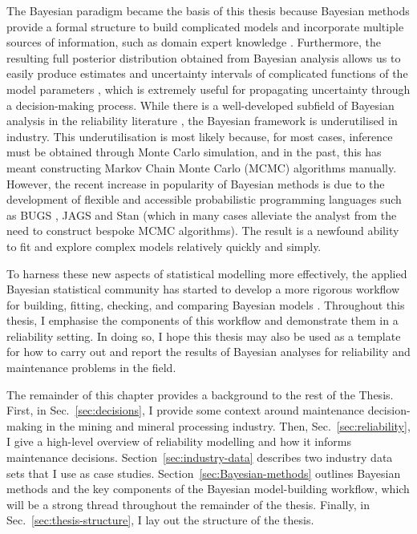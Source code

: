 The Bayesian paradigm became the basis of this thesis because Bayesian methods provide a formal structure to build complicated models and incorporate multiple sources of information, such as domain expert knowledge \citep{Meeker2022}. Furthermore, the resulting full posterior distribution obtained from Bayesian analysis allows us to easily produce estimates and uncertainty intervals of complicated functions of the model parameters \citep{Meeker2022}, which is extremely useful for propagating uncertainty through a decision-making process. While there is a well-developed subfield of Bayesian analysis in the reliability literature \citep{hamada_2008, Meeker2022}, the Bayesian framework is underutilised in industry. This underutilisation is most likely because, for most cases, inference must be obtained through Monte Carlo simulation, and in the past, this has meant constructing Markov Chain Monte Carlo (MCMC) algorithms manually. However, the recent increase in popularity of Bayesian methods is due to the development of flexible and accessible probabilistic programming languages such as BUGS \citep{lunn2012}, JAGS \citep{plummer2003} and Stan \citep{Stan2022} (which in many cases alleviate the analyst from the need to construct bespoke MCMC algorithms). The result is a newfound ability to fit and explore complex models relatively quickly and simply.

To harness these new aspects of statistical modelling more effectively, the applied Bayesian statistical community has started to develop a more rigorous workflow for building, fitting, checking, and comparing Bayesian models \citep{gelman_workflow_2020}. Throughout this thesis, I emphasise the components of this workflow and demonstrate them in a reliability setting. In doing so, I hope this thesis may also be used as a template for how to carry out and report the results of Bayesian analyses for reliability and maintenance problems in the field.

The remainder of this chapter provides a background to the rest of the Thesis. First, in Sec.~\ref{sec:decisions}, I provide some context around maintenance decision-making in the mining and mineral processing industry. Then, Sec.~\ref{sec:reliability}, I give a high-level overview of reliability modelling and how it informs maintenance decisions. Section~\ref{sec:industry-data} describes two industry data sets that I use as case studies. Section~\ref{sec:Bayesian-methods} outlines Bayesian methods and the key components of the Bayesian model-building workflow, which will be a strong thread throughout the remainder of the thesis. Finally, in Sec.~\ref{sec:thesis-structure}, I lay out the structure of the thesis.

